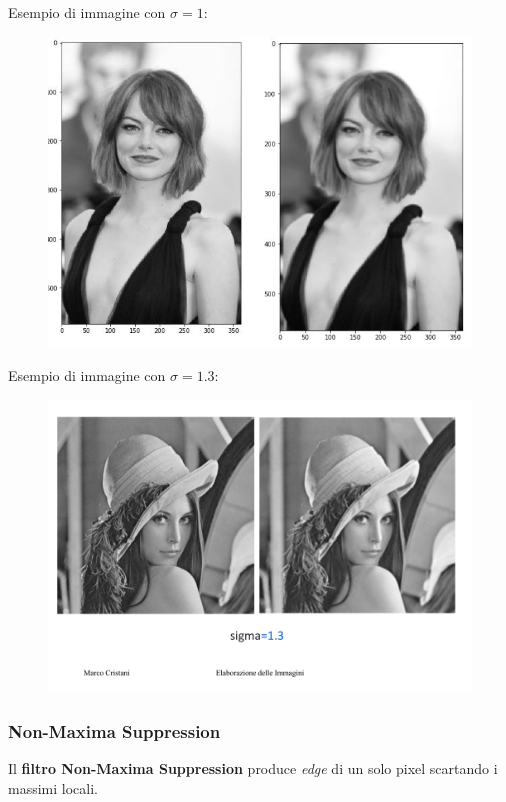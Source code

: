 \documentclass[a4paper]{article}
\begin{document}
	\noindent
	Esempio di immagine con $\sigma = 1$:
	\begin{figure}[!htp]
		\centering
		\includegraphics[width=.7\textwidth]{img/filtro_di_rinforzo_1.png}
	\end{figure}

	\noindent
	Esempio di immagine con $\sigma = 1.3$:
	\begin{figure}[!htp]
		\centering
		\includegraphics[width=.7\textwidth]{img/filtro_di_rinforzo_2.pdf}
	\end{figure}\newpage

	\subsubsection{Non-Maxima Suppression}
	
	Il \textcolor{Red3}{\textbf{filtro Non-Maxima Suppression}} produce \emph{edge} di un solo pixel scartando i massimi locali.\newline
	
\end{document}
